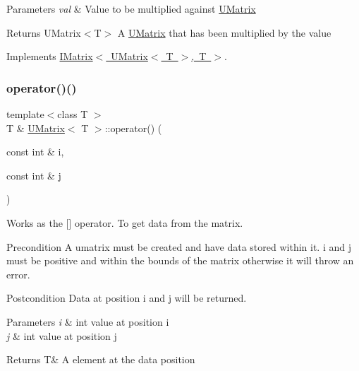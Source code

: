 \begin{DoxyParams}{Parameters}
{\em val} & Value to be multiplied against \mbox{\hyperlink{class_u_matrix}{U\+Matrix}} \\
\hline
\end{DoxyParams}
\begin{DoxyReturn}{Returns}
U\+Matrix$<$\+T$>$ A \mbox{\hyperlink{class_u_matrix}{U\+Matrix}} that has been multiplied by the value 
\end{DoxyReturn}


Implements \mbox{\hyperlink{class_i_matrix_a10121e038635bdf33552c6a1fb288398}{I\+Matrix$<$ U\+Matrix$<$ T $>$, T $>$}}.

\mbox{\label{class_u_matrix_a06c554ab9d6deb7d1950cdd49eb089e0}} 
\subsubsection{\texorpdfstring{operator()()}{operator()()}\hspace{0.1cm}{\footnotesize\ttfamily [1/2]}}
{\footnotesize\ttfamily template$<$class T $>$ \\
T \& \mbox{\hyperlink{class_u_matrix}{U\+Matrix}}$<$ T $>$\+::operator() (\begin{DoxyParamCaption}\item[{const int \&}]{i,  }\item[{const int \&}]{j }\end{DoxyParamCaption})}



Works as the \mbox{[}\mbox{]} operator. To get data from the matrix. 

\begin{DoxyPrecond}{Precondition}
A umatrix must be created and have data stored within it. i and j must be positive and within the bounds of the matrix otherwise it will throw an error. 
\end{DoxyPrecond}
\begin{DoxyPostcond}{Postcondition}
Data at position i and j will be returned.
\end{DoxyPostcond}

\begin{DoxyParams}{Parameters}
{\em i} & int value at position i \\
\hline
{\em j} & int value at position j \\
\hline
\end{DoxyParams}
\begin{DoxyReturn}{Returns}
T\& A element at the data position 
\end{DoxyReturn}
\mbox{\label{class_u_matrix_a2fbb6915ab1a6bb7a8944b51600b6d2d}} 

